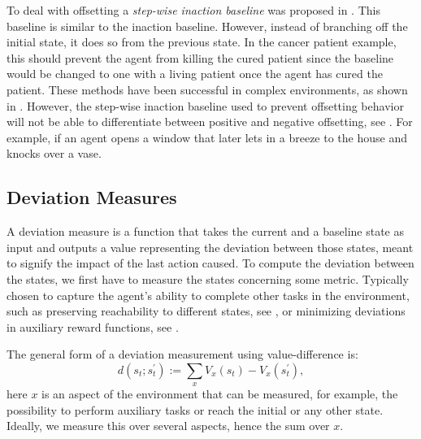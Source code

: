 \documentclass[12pt,A4]{report}
\theoremstyle{definition}
\begin{document}
To deal with offsetting a \textit{step-wise inaction baseline} was proposed in \citet{Krakovna19}. This baseline is similar to the inaction baseline. However, instead of branching off the initial state, it does so from the previous state. In the cancer patient example, this should prevent the agent from killing the cured patient since the baseline would be changed to one with a living patient once the agent has cured the patient. These methods have been successful in complex environments, as shown in \citet{Turner20}. However, the step-wise inaction baseline used to prevent offsetting behavior will not be able to differentiate between positive and negative offsetting, see \citet{Krakovna20}. For example, if an agent opens a window that later lets in a breeze to the house and knocks over a vase. 


\subsection{Deviation Measures}
A deviation measure is a function that takes the current and a baseline state as input and outputs a value representing the deviation between those states, meant to signify the impact of the last action caused. To compute the deviation between the states, we first have to measure the states concerning some metric. Typically chosen to capture the agent's ability to complete other tasks in the environment, such as preserving reachability to different states, see \citet{Krakovna19}, or minimizing deviations in auxiliary reward functions, see \citet{Turner19}. 

The general form of a deviation measurement using value-difference is:
  \[d(s_t;s^{\prime}_t) := \sum_x V_x(s_t) - V_x(s^{\prime}_t) ,\]
here $x$ is an aspect of the environment that can be measured, for example, the possibility to perform auxiliary tasks or reach the initial or any other state. Ideally, we measure this over several aspects, hence the sum over $x$.
\end{document}
